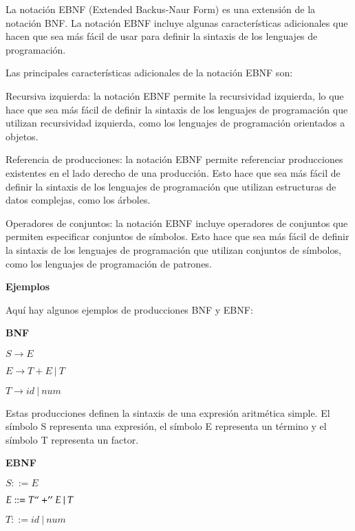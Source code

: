 \noindent La notación EBNF (Extended Backus-Naur Form) es una extensión de la notación BNF. La notación EBNF incluye algunas características adicionales que hacen que sea más fácil de usar para definir la sintaxis de los lenguajes de programación.

Las principales características adicionales de la notación EBNF son:

    Recursiva izquierda: la notación EBNF permite la recursividad izquierda, lo que hace que sea más fácil de definir la sintaxis de los lenguajes de programación que utilizan recursividad izquierda, como los lenguajes de programación orientados a objetos.
   
    Referencia de producciones: la notación EBNF permite referenciar producciones existentes en el lado derecho de una producción. Esto hace que sea más fácil de definir la sintaxis de los lenguajes de programación que utilizan estructuras de datos complejas, como los árboles.
    
    Operadores de conjuntos: la notación EBNF incluye operadores de conjuntos que permiten especificar conjuntos de símbolos. Esto hace que sea más fácil de definir la sintaxis de los lenguajes de programación que utilizan conjuntos de símbolos, como los lenguajes de programación de patrones.

\phantom{text}

\noindent \textbf{Ejemplos}

\phantom{text}
    

Aquí hay algunos ejemplos de producciones BNF y EBNF:

\phantom{text}

\noindent \textbf{BNF}

\phantom{text}

\begin{center}
    $S \xrightarrow{} E$
    
    $E \xrightarrow{} T + E\: |\: T$
    
    $T \xrightarrow{} id\: |\: num$
\end{center}

Estas producciones definen la sintaxis de una expresión aritmética simple. El símbolo S representa una expresión, el símbolo E representa un término y el símbolo T representa un factor.

\phantom{text}

\noindent \textbf{EBNF}

\phantom{text}

\begin{center}
    $S ::= E$
    
    $E ::= T ``+'' E\: |\: T$
    
    $T ::= id\: |\: num$
\end{center}

